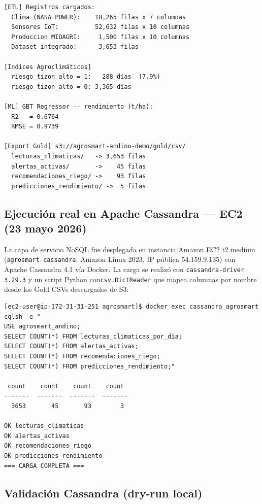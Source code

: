 \documentclass[12pt,a4paper]{article}
\begin{document}
\begin{lstlisting}[style=bashstyle, caption={Salida real del pipeline PySpark en EMR}]
[ETL] Registros cargados:
  Clima (NASA POWER):    18,265 filas x 7 columnas
  Sensores IoT:          52,632 filas x 10 columnas
  Produccion MIDAGRI:     1,500 filas x 10 columnas
  Dataset integrado:      3,653 filas

[Indices Agroclimáticos]
  riesgo_tizon_alto = 1:   288 días  (7.9%)
  riesgo_tizon_alto = 0: 3,365 días

[ML] GBT Regressor -- rendimiento (t/ha):
  R2   = 0.6764
  RMSE = 0.9739

[Export Gold] s3://agrosmart-andino-demo/gold/csv/
  lecturas_climaticas/   -> 3,653 filas
  alertas_activas/       ->    45 filas
  recomendaciones_riego/ ->    93 filas
  predicciones_rendimiento/ ->  5 filas
\end{lstlisting}

\subsection{Ejecución real en Apache Cassandra — EC2 (23 mayo 2026)}

La capa de servicio NoSQL fue desplegada en instancia Amazon EC2 t2.medium
(\texttt{agrosmart-cassandra}, Amazon Linux 2023, IP pública 54.159.9.135)
con Apache Cassandra 4.1 vía Docker. La carga se realizó con
\texttt{cassandra-driver 3.29.3} y un script Python con\texttt{csv.DictReader}
que mapea columnas por nombre desde los Gold CSVs descargados de S3:

\begin{lstlisting}[style=bashstyle, caption={Verificaci\'on COUNT(*) en Cassandra -- ejecuci\'on real}]
[ec2-user@ip-172-31-31-251 agrosmart]$ docker exec cassandra_agrosmart cqlsh -e "
USE agrosmart_andino;
SELECT COUNT(*) FROM lecturas_climaticas_por_dia;
SELECT COUNT(*) FROM alertas_activas;
SELECT COUNT(*) FROM recomendaciones_riego;
SELECT COUNT(*) FROM predicciones_rendimiento;"

 count    count    count    count
-------  -------  -------  -------
  3653       45       93        3

OK lecturas_climaticas
OK alertas_activas
OK recomendaciones_riego
OK predicciones_rendimiento
=== CARGA COMPLETA ===
\end{lstlisting}

\subsection{Validación Cassandra (dry-run local)}
\end{document}
